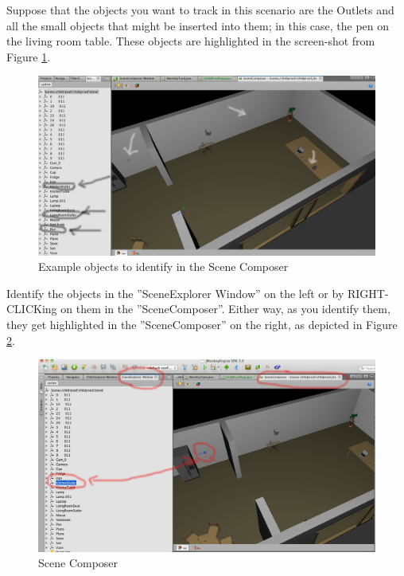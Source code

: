 Suppose that the objects you want to track in this scenario are the Outlets and all the small objects that might be inserted into them; in this case, the pen on the living room table. These objects are highlighted in the screen-shot from Figure \ref{fig:sd_objects_to_identify}.
\begin{figure}[H]
	\centering
	\includegraphics[width=\linewidth]{gfx/Chapter_SD_UserGuide/objects_to_identify}
	\caption{Example objects to identify in the Scene Composer}
	\label{fig:sd_objects_to_identify}
\end{figure}

Identify the objects in the ''SceneExplorer Window'' on the left or by RIGHT-CLICKing on them in the ''SceneComposer''. Either way, as you identify them, they get highlighted in the ''SceneComposer'' on the right, as depicted in Figure \ref{fig:sd_scene_composer}.
\begin{figure}[H]
	\centering
	\includegraphics[width=\linewidth]{gfx/Chapter_SD_UserGuide/scenecomposer}
	\caption{Scene Composer}
	\label{fig:sd_scene_composer}
\end{figure}

